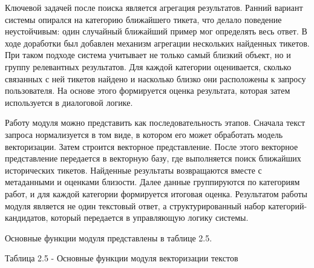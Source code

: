 \documentclass[14pt,a4paper]{extarticle}
\renewcommand{\textbf}[1]{#1}
\numberwithin{figure}{section}
\numberwithin{table}{section}
\begin{document}
Ключевой задачей после поиска является агрегация результатов. Ранний
вариант системы опирался на категорию ближайшего тикета, что делало
поведение неустойчивым: один случайный ближайший пример мог определять
весь ответ. В ходе доработки был добавлен механизм агрегации нескольких
найденных тикетов. При таком подходе система учитывает не только самый
близкий объект, но и группу релевантных результатов. Для каждой
категории оценивается, сколько связанных с ней тикетов найдено и
насколько близко они расположены к запросу пользователя. На основе этого
формируется оценка результата, которая затем используется в диалоговой
логике.

Работу модуля можно представить как последовательность этапов. Сначала
текст запроса нормализуется в том виде, в котором его может обработать
модель векторизации. Затем строится векторное представление. После этого векторное представление
передается в векторную базу, где выполняется поиск ближайших
исторических тикетов. Найденные результаты возвращаются вместе с
метаданными и оценками близости. Далее данные группируются по категориям
работ, и для каждой категории формируется итоговая оценка. Результатом
работы модуля является не один текстовый ответ, а структурированный
набор категорий-кандидатов, который передается в управляющую логику
системы.

Основные функции модуля представлены в таблице 2.5.

\textbf{Таблица 2.5 - Основные функции модуля векторизации текстов}
\end{document}
